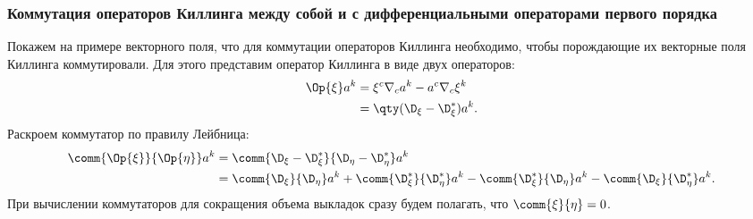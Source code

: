     \subsubsection{Коммутация операторов Киллинга между собой и с дифференциальными операторами первого порядка}

        Покажем на примере векторного поля, что для коммутации операторов Киллинга необходимо, чтобы порождающие их векторные поля Киллинга коммутировали. Для этого представим оператор Киллинга в виде двух операторов:
        \begin{equation}\begin{aligned}
            \Op{\xi} a^k
                &= \xi^c \nabla_c a^k - a^c \nabla_c \xi^k \\
                &= \qty(\D_\xi - \D^{*}_\xi) a^k .
        \end{aligned}\end{equation}
        Раскроем коммутатор по правилу Лейбница:
        \begin{equation}\begin{aligned}
            \comm{\Op{\xi}}{\Op{\eta}} a^k
                &= \comm{\D_\xi - \D^{*}_\xi}{\D_\eta - \D^{*}_\eta} a^k \\
                &= \comm{\D_\xi}{\D_\eta} a^k
                    + \comm{\D^{*}_\xi}{\D^{*}_\eta} a^k
                    - \comm{\D^{*}_\xi}{\D_\eta} a^k
                    - \comm{\D_\xi}{\D^{*}_\eta} a^k .
        \end{aligned}\end{equation}
        При вычислении коммутаторов для сокращения объема выкладок сразу будем полагать, что $\comm{\xi}{\eta} = 0$.

